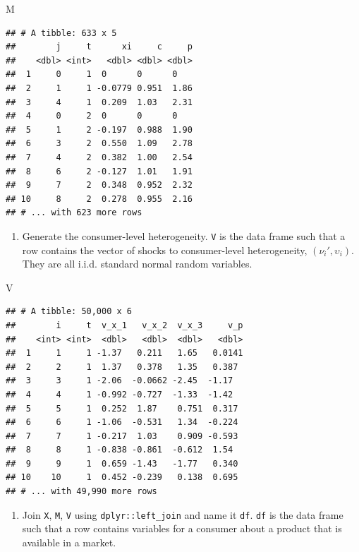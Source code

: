 \documentclass[
]{book}
\newenvironment{Shaded}{\begin{snugshade}}{\end{snugshade}}
\newcommand{\NormalTok}[1]{#1}
\providecommand{\tightlist}{%
  \setlength{\itemsep}{0pt}\setlength{\parskip}{0pt}}
\begin{document}
\begin{Shaded}
\begin{Highlighting}[]
\NormalTok{M}
\end{Highlighting}
\end{Shaded}

\begin{verbatim}
## # A tibble: 633 x 5
##        j     t      xi     c     p
##    <dbl> <int>   <dbl> <dbl> <dbl>
##  1     0     1  0      0      0   
##  2     1     1 -0.0779 0.951  1.86
##  3     4     1  0.209  1.03   2.31
##  4     0     2  0      0      0   
##  5     1     2 -0.197  0.988  1.90
##  6     3     2  0.550  1.09   2.78
##  7     4     2  0.382  1.00   2.54
##  8     6     2 -0.127  1.01   1.91
##  9     7     2  0.348  0.952  2.32
## 10     8     2  0.278  0.955  2.16
## # ... with 623 more rows
\end{verbatim}

\begin{enumerate}
\def\labelenumi{\arabic{enumi}.}
\setcounter{enumi}{3}
\tightlist
\item
  Generate the consumer-level heterogeneity. \texttt{V} is the data frame such that a row contains the vector of shocks to consumer-level heterogeneity, \((\nu_{i}', \upsilon_i)\). They are all i.i.d. standard normal random variables.
\end{enumerate}

\begin{Shaded}
\begin{Highlighting}[]
\NormalTok{V}
\end{Highlighting}
\end{Shaded}

\begin{verbatim}
## # A tibble: 50,000 x 6
##        i     t  v_x_1   v_x_2  v_x_3     v_p
##    <int> <int>  <dbl>   <dbl>  <dbl>   <dbl>
##  1     1     1 -1.37   0.211   1.65   0.0141
##  2     2     1  1.37   0.378   1.35   0.387 
##  3     3     1 -2.06  -0.0662 -2.45  -1.17  
##  4     4     1 -0.992 -0.727  -1.33  -1.42  
##  5     5     1  0.252  1.87    0.751  0.317 
##  6     6     1 -1.06  -0.531   1.34  -0.224 
##  7     7     1 -0.217  1.03    0.909 -0.593 
##  8     8     1 -0.838 -0.861  -0.612  1.54  
##  9     9     1  0.659 -1.43   -1.77   0.340 
## 10    10     1  0.452 -0.239   0.138  0.695 
## # ... with 49,990 more rows
\end{verbatim}

\begin{enumerate}
\def\labelenumi{\arabic{enumi}.}
\setcounter{enumi}{4}
\tightlist
\item
  Join \texttt{X}, \texttt{M}, \texttt{V} using \texttt{dplyr::left\_join} and name it \texttt{df}. \texttt{df} is the data frame such that a row contains variables for a consumer about a product that is available in a market.
\end{enumerate}
\end{document}
